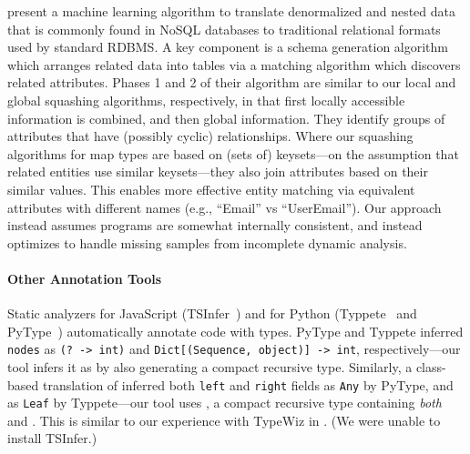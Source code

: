 present a machine learning algorithm to translate denormalized
and nested data that is commonly found in NoSQL databases to traditional
relational formats used by standard RDBMS.
A key component is a schema generation algorithm which arranges related
data into tables via a matching algorithm which discovers related attributes.
Phases 1 and 2 of their algorithm are similar to our local and global
squashing algorithms, respectively, in that first locally accessible information
is combined, and then global information.
They identify groups of attributes that have (possibly cyclic) relationships.
Where our squashing algorithms for map types are based on (sets of) keysets---on the 
assumption that related entities use similar keysets---they also join attributes
based on their similar values.
This enables more effective entity matching via equivalent attributes
with different names (e.g., ``Email'' vs ``UserEmail'').
Our approach instead assumes programs are somewhat internally consistent, and instead
optimizes to handle missing samples from incomplete dynamic analysis.


\paragraph{Other Annotation Tools}
Static analyzers
for JavaScript
(TSInfer~) and for Python (Typpete~
and PyType~)
automatically annotate code with types.
PyType and Typpete inferred \texttt{nodes}
as \texttt{(? -> int)}
and \texttt{Dict[(Sequence, object)] -> int}, respectively---our tool 
infers it as \clj{[Op -> Int]} by also generating a compact recursive
type.
Similarly, a class-based translation of
inferred both \texttt{left} and \texttt{right}
fields
as \texttt{Any} by PyType, and as \texttt{Leaf} by Typpete---our tool
uses ,
a compact recursive type containing \emph{both}  and .
This is similar to our experience with TypeWiz in .
(We were unable to install TSInfer.)

